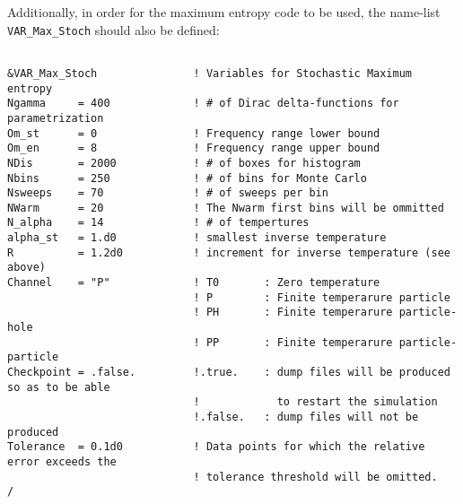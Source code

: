 Additionally, in order for the maximum entropy code to be used, the name-list \texttt{VAR\_Max\_Stoch} should also be defined:

\lstset{style=fortran}
\begin{lstlisting} 

&VAR_Max_Stoch               ! Variables for Stochastic Maximum entropy
Ngamma     = 400             ! # of Dirac delta-functions for parametrization
Om_st      = 0               ! Frequency range lower bound
Om_en      = 8               ! Frequency range upper bound
NDis       = 2000            ! # of boxes for histogram
Nbins      = 250             ! # of bins for Monte Carlo
Nsweeps    = 70              ! # of sweeps per bin
NWarm      = 20              ! The Nwarm first bins will be ommitted
N_alpha    = 14              ! # of tempertures
alpha_st   = 1.d0            ! smallest inverse temperature
R          = 1.2d0           ! increment for inverse temperature (see above) 
Channel    = "P"             ! T0       : Zero temperature
                             ! P        : Finite temperarure particle 
                             ! PH       : Finite temperarure particle-hole
                             ! PP       : Finite temperarure particle-particle 
Checkpoint = .false.         !.true.    : dump files will be produced so as to be able
                             !            to restart the simulation
                             !.false.   : dump files will not be produced 
Tolerance  = 0.1d0           ! Data points for which the relative error exceeds the
                             ! tolerance threshold will be omitted.
/
\end{lstlisting}




